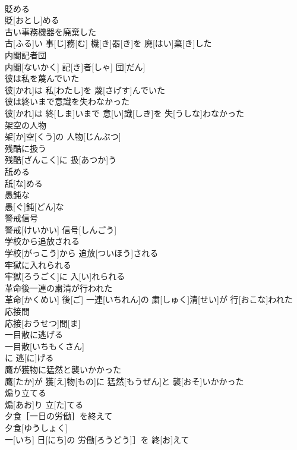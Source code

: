 \documentclass[8pt]{extreport}
\begin{document}
\begin{CJK}{UTF8}{min}
\\	貶める	
\\	貶[おとし]める 
\\	古い事務機器を廃棄した	
\\	古[ふる]い 事[じ]務[む] 機[き]器[き]を 廃[はい]棄[き]した
\\	内閣記者団	
\\	内閣[ないかく] 記[き]者[しゃ] 団[だん]
\\	彼は私を蔑んでいた	
\\	彼[かれ]は 私[わたし]を 蔑[さげす]んでいた
\\	彼は終いまで意識を失わなかった	
\\	彼[かれ]は 終[しま]いまで 意[い]識[しき]を 失[うしな]わなかった
\\	架空の人物	
\\	架[か]空[くう]の 人物[じんぶつ]
\\	残酷に扱う	
\\	残酷[ざんこく]に 扱[あつか]う
\\	舐める	
\\	舐[な]める
\\	愚鈍な	
\\	愚[ぐ]鈍[どん]な
\\	警戒信号	
\\	警戒[けいかい] 信号[しんごう]
\\	学校から追放される	
\\	学校[がっこう]から 追放[ついほう]される
\\	牢獄に入れられる	
\\	牢獄[ろうごく]に 入[い]れられる
\\	革命後一連の粛清が行われた	
\\	革命[かくめい] 後[ご] 一連[いちれん]の 粛[しゅく]清[せい]が 行[おこな]われた
\\	応接間	
\\	応接[おうせつ]間[ま]
\\	一目散に逃げる	
\\	一目散[いちもくさん]
\\	に 逃[に]げる 
\\	鷹が獲物に猛然と襲いかかった	
\\	鷹[たか]が 獲[え]物[もの]に 猛然[もうぜん]と 襲[おそ]いかかった
\\	煽り立てる	
\\	煽[あお]り 立[た]てる
\\	夕食［一日の労働］を終えて	
\\	夕食[ゆうしょく]
\\	一[いち] 日[にち]の 労働[ろうどう]］を 終[お]えて

\end{CJK}
\end{document}
